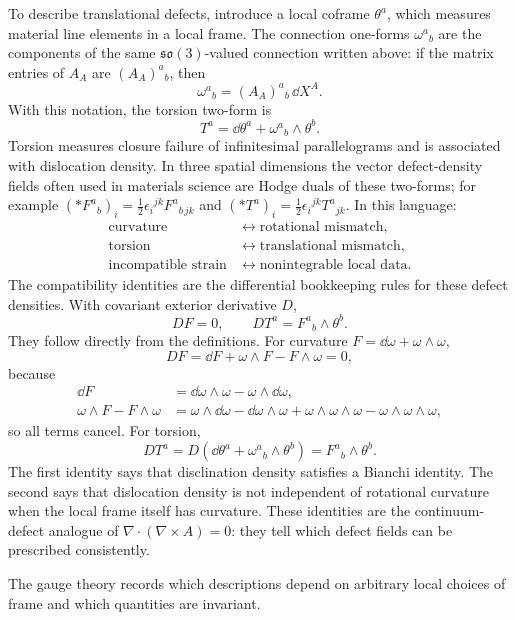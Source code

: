 To describe translational defects, introduce a local coframe \(\theta^a\), which
measures material line elements in a local frame. The connection one-forms
\(\omega^a{}_b\) are the components of the same \(\mathfrak{so}(3)\)-valued
connection written above: if the matrix entries of \(A_A\) are
\((A_A)^a{}_b\), then
\[
  \omega^a{}_b=(A_A)^a{}_b\,\dd X^A.
\]
With this notation, the torsion two-form is
\[
  T^a=\dd\theta^a+\omega^a{}_b\wedge\theta^b.
\]
Torsion measures closure failure of infinitesimal parallelograms and is
associated with dislocation density. In three spatial dimensions the vector
defect-density fields often used in materials science are Hodge duals of these
two-forms; for example
\((*F^a{}_b)_i=\frac12\epsilon_i{}^{jk}F^a{}_{b\,jk}\) and
\((*T^a)_i=\frac12\epsilon_i{}^{jk}T^a{}_{jk}\). In this
language:
\[
\begin{aligned}
  \text{curvature} &\longleftrightarrow \text{rotational mismatch},\\
  \text{torsion} &\longleftrightarrow \text{translational mismatch},\\
  \text{incompatible strain} &\longleftrightarrow \text{nonintegrable local data}.
\end{aligned}
\]
The compatibility identities are the differential bookkeeping rules for these
defect densities. With covariant exterior derivative \(D\),
\[
  D F=0,
  \qquad
  D T^a=F^a{}_b\wedge\theta^b.
\]
They follow directly from the definitions. For curvature
\(F=\dd\omega+\omega\wedge\omega\),
\[
  DF=\dd F+\omega\wedge F-F\wedge\omega=0,
\]
because
\[
\begin{aligned}
  \dd F
  &=\dd\omega\wedge\omega-\omega\wedge\dd\omega,\\
  \omega\wedge F-F\wedge\omega
  &=\omega\wedge\dd\omega-\dd\omega\wedge\omega
    +\omega\wedge\omega\wedge\omega-\omega\wedge\omega\wedge\omega,
\end{aligned}
\]
so all terms cancel. For torsion,
\[
  DT^a
  =
  D(\dd\theta^a+\omega^a{}_b\wedge\theta^b)
  =
  F^a{}_b\wedge\theta^b.
\]
The first identity says that disclination density satisfies a Bianchi identity.
The second says that dislocation density is not independent of rotational
curvature when the local frame itself has curvature. These identities are the
continuum-defect analogue of \(\nabla\cdot(\nabla\times A)=0\): they tell which
defect fields can be prescribed consistently.

The gauge theory records which descriptions depend on arbitrary local choices of
frame and which quantities are invariant.

